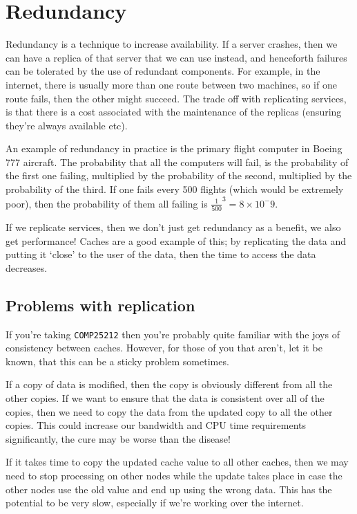 \section{Redundancy}

Redundancy is a technique to increase availability. If a server crashes, then we
can have a replica of that server that we can use instead, and henceforth
failures can be tolerated by the use of redundant components. For example, in
the internet, there is usually more than one route between two machines, so if
one route fails, then the other might succeed. The trade off with replicating
services, is that there is a cost associated with the maintenance of the
replicas (ensuring they're always available etc).

An example of redundancy in practice is the primary flight computer in Boeing
777 aircraft. The probability that all the computers will fail, is the
probability of the first one failing, multiplied by the probability of the
second, multiplied by the probability of the third. If one fails every 500
flights (which would be extremely poor), then the probability of them all
failing is $\frac{1}{500}^3 = 8\times10^-9$.

If we replicate services, then we don't just get redundancy as a benefit, we
also get performance! Caches are a good example of this; by replicating the data
and putting it `close' to the user of the data, then the time to access the data
decreases.

\subsection{Problems with replication}

If you're taking \texttt{COMP25212} then you're probably quite familiar with the
joys of consistency between caches. However, for those of you that aren't, let
it be known, that this can be a sticky problem sometimes.

If a copy of data is modified, then the copy is obviously different from all the
other copies. If we want to ensure that the data is consistent over all of the
copies, then we need to copy the data from the updated copy to all the other
copies. This could increase our bandwidth and CPU time requirements
significantly, the cure may be worse than the disease!

If it takes time to copy the updated cache value to all other caches, then we
may need to stop processing on other nodes while the update takes place in case
the other nodes use the old value and end up using the wrong data. This has the
potential to be very slow, especially if we're working over the internet.

